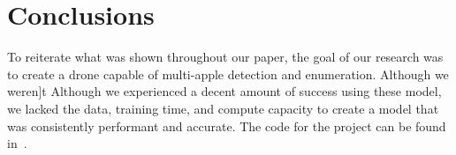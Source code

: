 \section{Conclusions}
To reiterate what was shown throughout our paper, the goal of our research was to create a drone capable of multi-apple detection and enumeration.
Although we weren]t 
Although we experienced a decent amount of success using these model, we lacked the data, training time, and compute capacity to create a model that was consistently performant and accurate.
The code for the project can be found in~\cite{FruitFly}.
